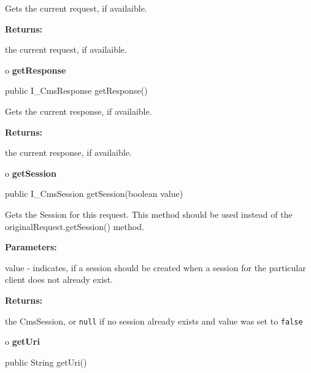 \begin{description}
\htmlDD Gets the current request, if availaible. 

\begin{description}
\item {\bf Returns:}  

the current request, if availaible.  
\end{description}

\end{description}

o {\bf getResponse} 

\begin{PRE}
 public I\_CmsResponse getResponse()
\end{PRE}

\begin{description}
\htmlDD Gets the current response, if availaible. 

\begin{description}
\item {\bf Returns:}  

the current response, if availaible.  
\end{description}

\end{description}

o {\bf getSession} 

\begin{PRE}
 public I\_CmsSession getSession(boolean value)
\end{PRE}

\begin{description}
\htmlDD Gets the Session for this request. \htmlBR
This method should be used instead of the originalRequest.getSession() method.


\begin{description}
\item {\bf Parameters:}  

value - indicates, if a session should be created when a session for the
particular client does not already exist.  
\item {\bf Returns:}  

the CmsSession, or {\tt null} if no session already exists and value was set
to {\tt false}  
\end{description}

\end{description}

o {\bf getUri} 

\begin{PRE}
 public String getUri()
\end{PRE}

